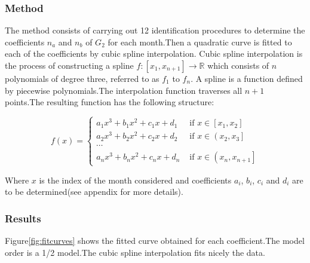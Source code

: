 \documentclass[a4paper,12pt]{article}
\numberwithin{equation}{section}
\begin{document}
\subsubsection{Method}
The method consists of carrying out 12 identification procedures to determine the coefficients $n_{a}$ and $n_{b}$ of $G_{2}$ for each month.Then a quadratic curve is fitted to each of the coefficients by cubic spline interpolation. Cubic spline interpolation is the process of constructing a spline $f:\left[x_{1}, x_{n+1}\right] \rightarrow \mathbb{R}$ which consists of $n$ polynomials of degree three, referred to as $f_{1}$ to $f_{n}$. A spline is a function defined by piecewise polynomials.The  interpolation function traverses all $n+1$ points.The resulting function has the following structure:

$$
f(x)= \begin{cases}a_{1} x^{3}+b_{1} x^{2}+c_{1} x+d_{1} & \text { if } x \in\left[x_{1}, x_{2}\right] \\ a_{2} x^{3}+b_{2} x^{2}+c_{2} x+d_{2} & \text { if } x \in\left(x_{2}, x_{3}\right] \\ \cdots & \\ a_{n} x^{3}+b_{n} x^{2}+c_{n} x+d_{n} & \text { if } x \in\left(x_{n}, x_{n+1}\right]\end{cases}
$$

\noindent
Where $x$ is the index of the month considered and coefficients $a_{i}$, $b_{i}$, $c_{i}$ and $d_{i}$ are to be determined(see appendix for more details).

\subsubsection{Results}
Figure\ref{fig:fitcurves} shows the fitted curve obtained for each coefficient.The model order is a 1/2 model.The cubic spline interpolation fits nicely the data.
\end{document}
